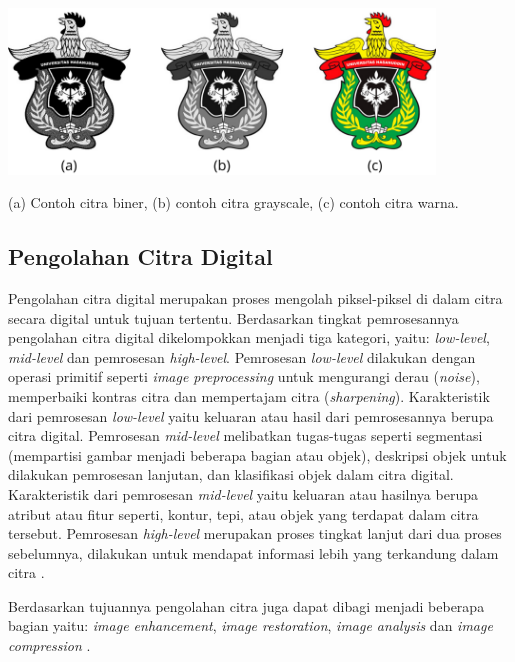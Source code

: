 \begin{afigure}
    \includegraphics[width=0.85\textwidth, center]{images/jenis-jenis-citra.png}
    \caption{(a) Contoh citra biner, (b) contoh citra grayscale, (c) contoh citra warna.}
    \label{fig:jenis-citra}
\end{afigure}


\subsection{Pengolahan Citra Digital}
Pengolahan citra digital merupakan proses mengolah piksel-piksel di dalam citra secara digital untuk tujuan tertentu. Berdasarkan tingkat pemrosesannya pengolahan citra digital dikelompokkan menjadi tiga kategori, yaitu: \textit{low-level}, \textit{mid-level} dan pemrosesan \textit{high-level}. Pemrosesan \textit{low-level} dilakukan dengan operasi primitif seperti \textit{image preprocessing} untuk mengurangi derau (\textit{noise}), memperbaiki kontras citra dan mempertajam citra (\textit{sharpening}). Karakteristik dari pemrosesan \textit{low-level} yaitu keluaran atau hasil dari pemrosesannya berupa citra digital. Pemrosesan \textit{mid-level} melibatkan tugas-tugas seperti segmentasi (mempartisi gambar menjadi beberapa bagian atau objek), deskripsi objek untuk dilakukan pemrosesan lanjutan, dan klasifikasi objek dalam citra digital. Karakteristik dari pemrosesan \textit{mid-level} yaitu keluaran atau hasilnya berupa atribut atau fitur seperti, kontur, tepi, atau objek yang terdapat dalam citra tersebut. Pemrosesan \textit{high-level} merupakan proses tingkat lanjut dari dua proses sebelumnya, dilakukan untuk mendapat informasi lebih yang terkandung dalam citra .


Berdasarkan tujuannya pengolahan citra juga dapat dibagi menjadi beberapa bagian yaitu: \textit{image enhancement}, \textit{image restoration}, \textit{image analysis} dan \textit{image compression} .

